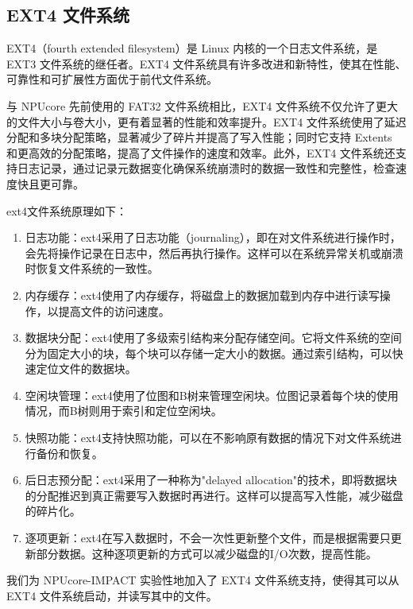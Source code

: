 \subsection{EXT4 文件系统}

EXT4（fourth extended filesystem）是 Linux 内核的一个日志文件系统，是 EXT3 文件系统的继任者。EXT4 文件系统具有许多改进和新特性，使其在性能、可靠性和可扩展性方面优于前代文件系统。

与 NPUcore 先前使用的 FAT32 文件系统相比，EXT4 文件系统不仅允许了更大的文件大小与卷大小，更有着显著的性能和效率提升。EXT4 文件系统使用了延迟分配和多块分配策略，显著减少了碎片并提高了写入性能；同时它支持 Extents 和更高效的分配策略，提高了文件操作的速度和效率。此外，EXT4 文件系统还支持日志记录，通过记录元数据变化确保系统崩溃时的数据一致性和完整性，检查速度快且更可靠。

ext4文件系统原理如下：
\begin{enumerate}
    \item 日志功能：ext4采用了日志功能（journaling），即在对文件系统进行操作时，会先将操作记录在日志中，然后再执行操作。这样可以在系统异常关机或崩溃时恢复文件系统的一致性。
    \item 内存缓存：ext4使用了内存缓存，将磁盘上的数据加载到内存中进行读写操作，以提高文件的访问速度。
    \item 数据块分配：ext4使用了多级索引结构来分配存储空间。它将文件系统的空间分为固定大小的块，每个块可以存储一定大小的数据。通过索引结构，可以快速定位文件的数据块。
    \item 空闲块管理：ext4使用了位图和B树来管理空闲块。位图记录着每个块的使用情况，而B树则用于索引和定位空闲块。
    \item 快照功能：ext4支持快照功能，可以在不影响原有数据的情况下对文件系统进行备份和恢复。
    \item 后日志预分配：ext4采用了一种称为"delayed allocation"的技术，即将数据块的分配推迟到真正需要写入数据时再进行。这样可以提高写入性能，减少磁盘的碎片化。
    \item 逐项更新：ext4在写入数据时，不会一次性更新整个文件，而是根据需要只更新部分数据。这种逐项更新的方式可以减少磁盘的I/O次数，提高性能。
\end{enumerate}

我们为 NPUcore-IMPACT 实验性地加入了 EXT4 文件系统支持，使得其可以从 EXT4 文件系统启动，并读写其中的文件。

